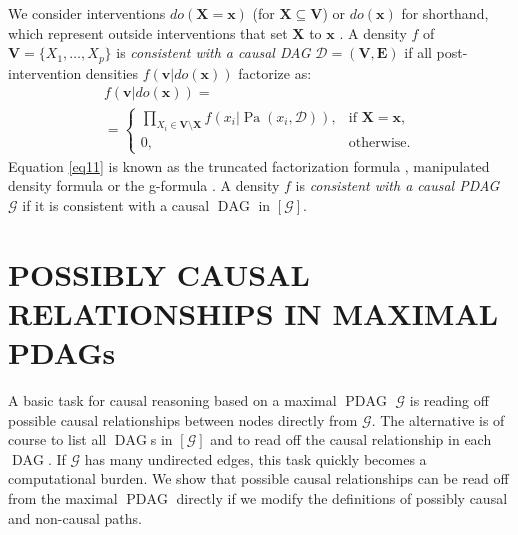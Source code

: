 \documentclass[letterpaper]{article}
\theoremstyle{definition}
\theoremstyle{remark}
\DeclareMathOperator{\PDAG}{PDAG}
\DeclareMathOperator{\DAG}{DAG}
\DeclareMathOperator{\Pa}{Pa}
\newcommand{\mpdag}{maximal $\PDAG$}
\newcommand{\MPDAG}{MAXIMAL PDAG}
\newcommand{\vars}[1][V]{\mathbf{#1}}
\newcommand{\g}[1][G]{\mathcal{#1}}
\begin{document}
We consider interventions $do(\mathbf{X} =\mathbf{x})$ (for $\mathbf{X}\subseteq \mathbf{V}$) or $do(\mathbf{x})$ for shorthand, which represent outside interventions that set $\mathbf{X}$ to $\mathbf{x}$ \citep{Pearl2009}. A density $f$  of $\mathbf{V} = \{X_1,\dots,X_p\}$ is \textit{consistent with a causal DAG} $\g[D] =(\mathbf{V},\mathbf{E})$ if all post-intervention densities $f(\mathbf{v}|do(\mathbf{x}))$ factorize as:
\begin{multline}
f(\mathbf{v}|do(\mathbf{x})) =  \\
=
\begin{cases}
\prod_{X_{i} \in \vars \setminus \mathbf{X}}f(x_{i}|\Pa(x_{i},\g[D])), &  \text{if }\mathbf{X} =\mathbf{x}, \\
0, & \text{otherwise.}
\end{cases}
\label{eq11}
\end{multline}
Equation \eqref{eq11} is known as the truncated factorization formula \citep{Pearl2009}, manipulated density formula \citep{spirtes2000causation} or the g-formula \citep{robins1986new}.
A density $f$ is \textit{consistent with a causal PDAG} $\g$ if it is consistent with a causal $\DAG$ in $[\g]$.
\section{POSSIBLY CAUSAL RELATIONSHIPS IN \MPDAG{}s} \label{sec:understanding}
A basic task for causal reasoning based on a \mpdag{} $\g$ is reading off possible causal relationships between nodes directly from $\g$. The alternative is of course to list all $\DAG$s in $[\g]$ and to read off the causal relationship in each $\DAG$. If $\g$ has many undirected edges, this task quickly becomes a computational burden. We show that possible causal relationships can be read off from the \mpdag{} directly if we modify the definitions of possibly causal and non-causal paths.
\end{document}
